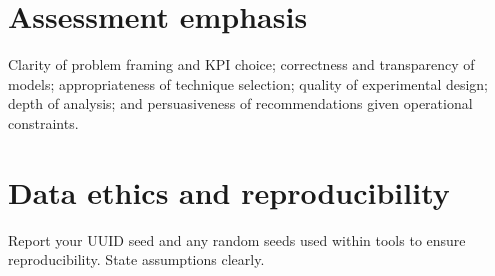\documentclass[11pt,a4paper]{article}
\begin{document}
\section*{Assessment emphasis}
Clarity of problem framing and KPI choice; correctness and transparency of models; appropriateness of technique selection; quality of experimental design; depth of analysis; and persuasiveness of recommendations given operational constraints.
\section*{Data ethics and reproducibility}
Report your UUID seed and any random seeds used within tools to ensure reproducibility. State assumptions clearly.
\end{document}
